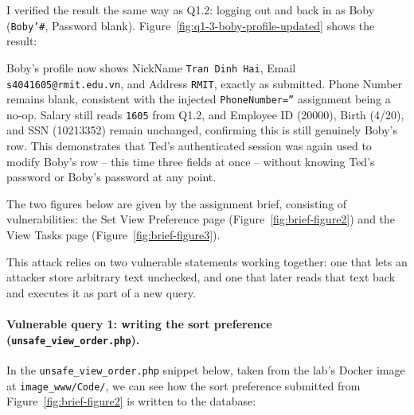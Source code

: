 I verified the result the same way as Q1.2: logging out and back in as Boby
(\texttt{Boby'\#}, Password blank). Figure~\ref{fig:q1-3-boby-profile-updated}
shows the result:


Boby's profile now shows NickName \texttt{Tran Dinh Hai}, Email
\texttt{s4041605@rmit.edu.vn}, and Address \texttt{RMIT}, exactly as
submitted. Phone Number remains blank, consistent with the injected
\texttt{PhoneNumber=''} assignment being a no-op. Salary still reads
\texttt{1605} from Q1.2, and Employee ID (20000), Birth (4/20), and SSN
(10213352) remain unchanged, confirming this is still genuinely Boby's row.
This demonstrates that Ted's authenticated session was again used to modify
Boby's row -- this time three fields at once -- without knowing Ted's
password or Boby's password at any point.


The two figures below are given by the assignment brief, consisting of vulnerabilities: the Set View Preference page (Figure~\ref{fig:brief-figure2}) and the View Tasks page (Figure~\ref{fig:brief-figure3}).



\dranswer

This attack relies on two vulnerable statements working together: one that
lets an attacker store arbitrary text unchecked, and one that later reads
that text back and executes it as part of a new query.

\paragraph{Vulnerable query 1: writing the sort preference (\texttt{unsafe\_view\_order.php}).}

In the \texttt{unsafe\_view\_order.php} snippet below, taken from the lab's Docker image at \texttt{image\_www/Code/}, we can see how the sort preference submitted from Figure~\ref{fig:brief-figure2} is written to the database:

